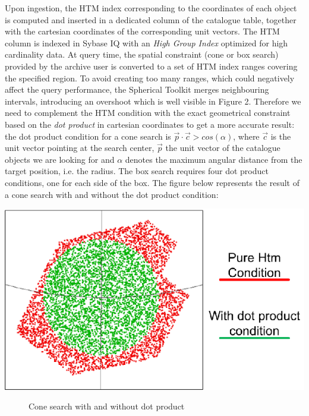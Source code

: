 Upon ingestion, the HTM index corresponding to the coordinates of each object is computed and inserted in a dedicated column of the catalogue table, together with the cartesian coordinates of the corresponding unit vectors. The HTM column is indexed in Sybase IQ with an \textit{High Group Index} optimized for high cardinality data. At query time, the spatial constraint (cone or box search) provided by the archive user is converted to a set of HTM index ranges covering the specified region. To avoid creating too many ranges, which could negatively affect the query performance, the Spherical Toolkit merges neighbouring intervals, introducing an overshoot which is well visible in Figure 2. Therefore we need to complement the HTM condition with the exact geometrical constraint based on the \textit{dot product} in cartesian coordinates to get a more accurate result: the dot product condition for a cone search is $\vec{p}\cdot\vec{c}>cos(\alpha)$, where $\vec{c}$ is the unit vector pointing at the search center, $\vec{p}$ the unit vector of the catalogue objects we are looking for and $\alpha$ denotes the maximum angular distance from the target position, i.e. the radius. The box search requires four dot product conditions, one for each side of the box. The figure below represents the result of a cone search with and without the dot product condition:\\

\begin {center}
\includegraphics  [scale=0.8]{part8/Moins_P64/P64_2}
\begin{figure} [h]
\caption{Cone search with and without dot product}
\end{figure}
\end {center}

